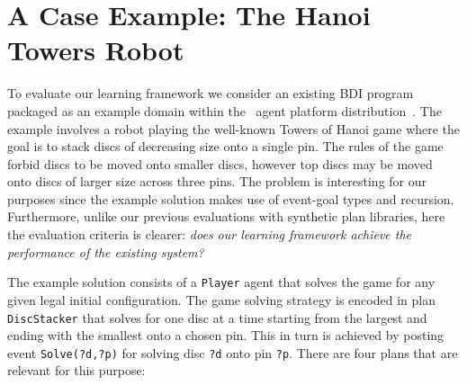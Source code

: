 \section{A Case Example: The Hanoi Towers Robot}\label{sec:hanoi}

\newcommand{\entity}[1]{\texttt{#1}}

To evaluate our learning framework we consider an existing BDI program
packaged as an example domain within the \JACK\ agent platform
distribution~\cite{BusettaRHL:AL99-JACK}.
The example involves a robot playing the well-known Towers of Hanoi game where the goal is to stack discs of decreasing size onto a single pin. The rules of the game forbid discs to be moved onto smaller discs, however top discs may be moved onto discs of larger size across three pins. The problem is interesting for our purposes since the example solution makes use of event-goal types and recursion. Furthermore, unlike our previous evaluations \cite{Airiau:IJAT:09,Singh:AAMAS10} with synthetic plan libraries, here the evaluation criteria is clearer: \emph{does our learning framework achieve the performance of the existing system?}


The example solution consists of a \entity{Player} agent that solves the game for 
any given legal initial configuration. The game solving strategy is encoded in plan
\entity{DiscStacker} that solves for one disc at a time starting from the largest
and ending with the smallest onto a chosen pin. This in turn is achieved by posting 
event \entity{Solve(?d,?p)} for solving disc \entity{?d} 
onto pin \entity{?p}. There are four plans that are relevant for this purpose:
%

